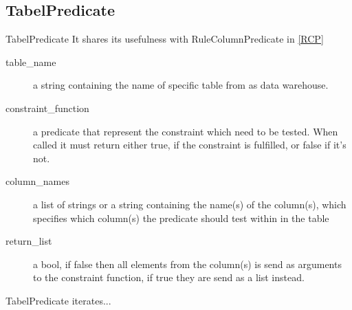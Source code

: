 \subsection{TabelPredicate}
TabelPredicate 
It shares its usefulness with RuleColumnPredicate in \cref{RCP}


\begin{description}
\item [table\_name] a string containing the name of specific table from as data warehouse. 
\item [constraint\_function] a predicate that represent the constraint which need to be tested. When called it must return either true, if the constraint is fulfilled, or false if it's not.
\item [column\_names] a list of strings or a string containing the name(s) of the column(s), which specifies which column(s) the predicate should test within in the table
\item [return\_list] a bool, if false then all elements from the column(s) is send as arguments to the constraint function, if true they are send as a list instead.
\end{description}

TabelPredicate iterates...
